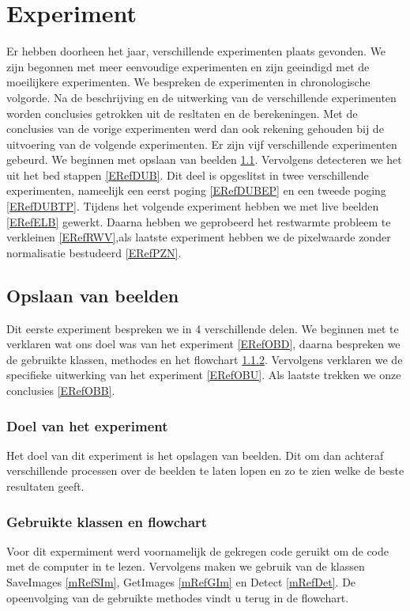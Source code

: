 \chapter{Experiment}
\label{ERef}
Er hebben doorheen het jaar, verschillende experimenten plaats gevonden. We zijn begonnen met meer eenvoudige experimenten en zijn geeindigd met de moeilijkere experimenten. We bespreken de experimenten in chronologische volgorde. Na de beschrijving en de uitwerking van de verschillende experimenten worden conclusies getrokken uit de resltaten en de berekeningen. Met de conclusies van de vorige experimenten werd dan ook rekening gehouden bij de uitvoering van de volgende experimenten. Er zijn vijf verschillende experimenten gebeurd. We beginnen met opslaan van beelden \ref{ERefOvB}. Vervolgens detecteren we het uit het bed stappen \ref{ERefDUB}. Dit deel is opgeslitst in twee verschillende experimenten, nameelijk een eerst poging \ref{ERefDUBEP} en een tweede poging \ref{ERefDUBTP}. Tijdens het volgende experiment hebben we met live beelden \ref{ERefELB} gewerkt. Daarna hebben we geprobeerd het restwarmte probleem te verkleinen \ref{ERefRWV},als laatste experiment hebben we de pixelwaarde zonder normalisatie bestudeerd \ref{ERefPZN}.

\section{Opslaan van beelden}
\label{ERefOvB}
Dit eerste experiment bespreken we in 4 verschillende delen. We beginnen met te verklaren wat ons doel was van het experiment \ref{ERefOBD}, daarna bespreken we de gebruikte klassen, methodes en het flowchart \ref{ERefOBF}. Vervolgens verklaren we de specifieke uitwerking van het experiment \ref{ERefOBU}. Als laatste trekken we onze conclusies \ref{ERefOBB}.

\subsection{Doel van het experiment}
Het doel van dit experiment is het opslagen van beelden. Dit om dan achteraf verschillende processen over de beelden te laten lopen en zo te zien welke de beste resultaten geeft.
\label{ERefOBD}

\subsection{Gebruikte klassen en flowchart}
\label{ERefOBF}
Voor dit expermiment werd voornamelijk de gekregen code geruikt om de code met de computer in te lezen. Vervolgens maken we gebruik van de klassen SaveImages \ref{mRefSIm}, GetImages \ref{mRefGIm} en Detect \ref{mRefDet}. De opeenvolging van de gebruikte methodes vindt u terug in de flowchart. 

